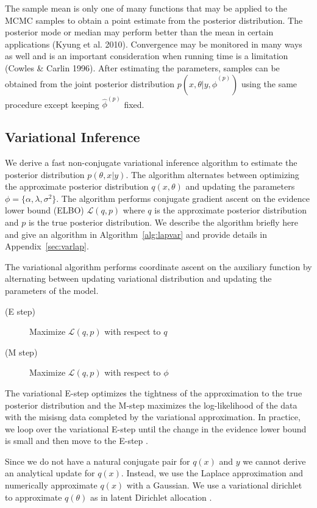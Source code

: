 \documentclass[11pt]{amsart}
\begin{document}
The sample mean is only one of many functions that may be applied to the MCMC samples to obtain a point estimate from the posterior distribution. The posterior mode or median may perform better than the mean in certain applications (Kyung et al. 2010). Convergence may be monitored in many ways as well and is an important consideration when running time is a limitation (Cowles \& Carlin 1996). After estimating the parameters, samples can be obtained from the joint posterior distribution $p(x,\theta | y, \hat{\phi}^{(p)})$ using the same procedure except keeping $\hat{\phi}^{(p)}$ fixed.

\subsection{Variational Inference}

We derive a fast non-conjugate variational inference algorithm to estimate the posterior distribution $p(\theta, x | y)$. The algorithm alternates between optimizing the approximate posterior distribution $q(x, \theta)$ and updating the parameters $\phi=\{\alpha, \lambda, \sigma^2\}$. The algorithm performs conjugate gradient ascent on the evidence lower bound (ELBO) $\mathcal{L}(q, p)$ where $q$ is the approximate posterior distribution and $p$ is the true posterior distribution. We describe the algorithm briefly here and give an algorithm in Algorithm~\ref{alg:lapvar} and provide details in Appendix~\ref{sec:varlap}.

The variational algorithm performs coordinate ascent on the auxiliary function by alternating between updating variational distribution and updating the parameters of the model.
\begin{description}
	\item[(E step)] Maximize $\mathcal{L}(q, p)$ with respect to $q$
	\item[(M step)] Maximize $\mathcal{L}(q, p)$ with respect to $\phi$
\end{description}
The variational E-step optimizes the tightness of the approximation to the true posterior distribution and the M-step maximizes the log-likelihood of the data with the misisng data  completed by the variational approximation. In practice, we loop over the variational E-step until the change in the evidence lower bound is small and then move to the E-step \cite{Blei}.

Since we do not have a natural conjugate pair for $q(x)$ and $y$ we cannot derive an analytical update for $q(x)$. Instead, we use the Laplace approximation and numerically approximate $q(x)$ with a Gaussian. We use a variational dirichlet to approximate $q(\theta)$ as in latent Dirichlet allocation \cite{Blei}. 
\end{document}
